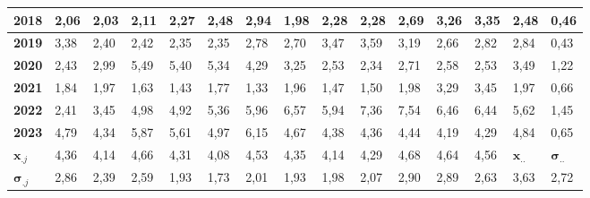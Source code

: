 \begin{tabular}{|l|l|l|l|l|l|l|l|l|l|l|l|l|l|l|}
    \textbf{2018} & 2,06 & 2,03 & 2,11 & 2,27 & 2,48 & 2,94 & 1,98 & 2,28 & 2,28 & 2,69 & 3,26 & 3,35 & 2,48 & 0,46 \\ \hline
    \textbf{2019} & 3,38 & 2,40 & 2,42 & 2,35 & 2,35 & 2,78 & 2,70 & 3,47 & 3,59 & 3,19 & 2,66 & 2,82 & 2,84 & 0,43 \\ \hline
    \textbf{2020} & 2,43 & 2,99 & 5,49 & 5,40 & 5,34 & 4,29 & 3,25 & 2,53 & 2,34 & 2,71 & 2,58 & 2,53 & 3,49 & 1,22 \\ \hline
    \textbf{2021} & 1,84 & 1,97 & 1,63 & 1,43 & 1,77 & 1,33 & 1,96 & 1,47 & 1,50 & 1,98 & 3,29 & 3,45 & 1,97 & 0,66 \\ \hline
    \textbf{2022} & 2,41 & 3,45 & 4,98 & 4,92 & 5,36 & 5,96 & 6,57 & 5,94 & 7,36 & 7,54 & 6,46 & 6,44 & 5,62 & 1,45 \\ \hline
    \textbf{2023} & 4,79 & 4,34 & 5,87 & 5,61 & 4,97 & 6,15 & 4,67 & 4,38 & 4,36 & 4,44 & 4,19 & 4,29 & 4,84 & 0,65 \\ \hline
    \textbf{$\bm{x}_{.j}$} & 4,36 & 4,14 & 4,66 & 4,31 & 4,08 & 4,53 & 4,35 & 4,14 & 4,29 & 4,68 & 4,64 & 4,56 & $\bm{x}_{..}$ & $\bm{\sigma}_{..}$ \\ \hline
    \textbf{$\bm{\sigma}_{.j}$} & 2,86 & 2,39 & 2,59 & 1,93 & 1,73 & 2,01 & 1,93 & 1,98 & 2,07 & 2,90 & 2,89 & 2,63 & 3,63 & 2,72 \\ \hline
\end{tabular}
